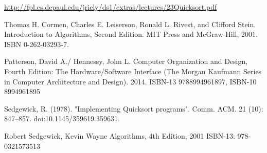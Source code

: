 \documentclass{oblivoir}
\begin{document}
\url{http://fpl.cs.depaul.edu/jriely/ds1/extras/lectures/23Quicksort.pdf}

\begin{thebibliography}{}
    Thomas H. Cormen, Charles E. Leiserson, Ronald L. Rivest, and Clifford Stein. Introduction to Algorithms, Second Edition. MIT Press and McGraw-Hill, 2001. ISBN 0-262-03293-7.
    
    Patterson, David A./ Hennessy, John L. Computer Organization and Design, Fourth Edition: The Hardware/Software Interface (The Morgan Kaufmann Series in Computer Architecture and Design). 2014. ISBN-13 9788994961897, ISBN-10 8994961895

    Sedgewick, R. (1978). "Implementing Quicksort programs". Comm. ACM. 21 (10): 847–857. doi:10.1145/359619.359631.

    Robert Sedgewick, Kevin Wayne Algorithms, 4th Edition, 2001 ISBN-13: 978-0321573513

\end{thebibliography}
\end{document}
